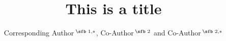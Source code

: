 \documentclass[nocrop]{bioinfo}
\begin{document}

\subtitle{}

\title[short Title]{This is a title}
\author[Sample \textit{et~al}.]{Corresponding Author\,$^{\text{\sfb 1,}*}$, Co-Author\,$^{\text{\sfb 2}}$ and Co-Author\,$^{\text{\sfb 2,}*}$}
\address{$^{\text{\sf 1}}$Department, Institution, City, Post Code, Country and \\
$^{\text{\sf 2}}$Department, Institution, City, Post Code,
Country.}


\history{}

\editor{}



\maketitle







\vspace*{-10pt}


\vspace*{-12pt}


\vspace*{-12pt}


\end{document}
